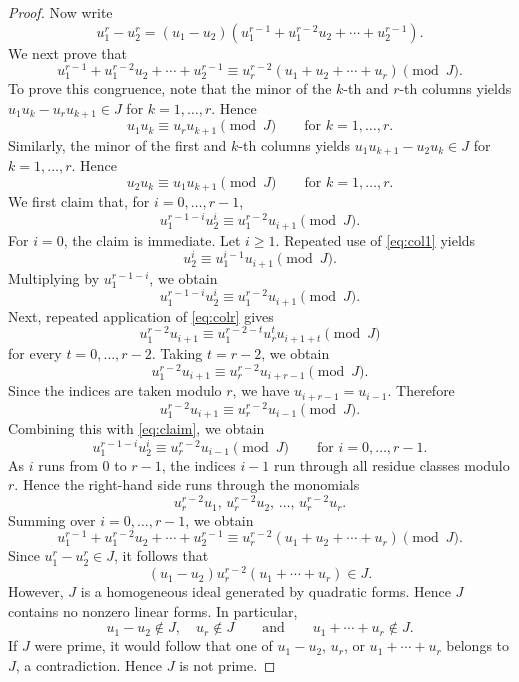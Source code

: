 \documentclass[12pt]{amsart}
\begin{document}
\begin{proof}
Now write
\[
u_1^r-u_2^r
=
(u_1-u_2)
\left(
u_1^{r-1}+u_1^{r-2}u_2+\cdots+u_2^{r-1}
\right).
\]
We next prove that
\[
u_1^{r-1}+u_1^{r-2}u_2+\cdots+u_2^{r-1}
\equiv
u_r^{r-2}(u_1+u_2+\cdots+u_r)
\pmod J.
\]
To prove this congruence, note that the minor of the $k$-th and $r$-th
columns yields $u_1u_k-u_ru_{k+1}\in J$ for $k=1,\ldots,r$. Hence
\begin{equation}\label{eq:colr}
u_1u_k
\equiv
u_ru_{k+1}
\pmod J
\qquad \text{for } k=1,\ldots,r.
\end{equation}
Similarly, the minor of the first and $k$-th columns yields
$u_1u_{k+1}-u_2u_k\in J$ for $k=1,\ldots,r$. Hence
\begin{equation}\label{eq:col1}
u_2u_k
\equiv
u_1u_{k+1}
\pmod J
\qquad \text{for } k=1,\ldots,r.
\end{equation}
We first claim that, for $i=0,\ldots,r-1$,
\begin{equation}\label{eq:claim}
u_1^{r-1-i}u_2^i
\equiv
u_1^{r-2}u_{i+1}
\pmod J.
\end{equation}
For $i=0$, the claim is immediate. Let $i\geq 1$. Repeated use of
\eqref{eq:col1} yields
\[
u_2^i
\equiv
u_1^{i-1}u_{i+1}
\pmod J.
\]
Multiplying by $u_1^{r-1-i}$, we obtain
\[
u_1^{r-1-i}u_2^i
\equiv
u_1^{r-2}u_{i+1}
\pmod J.
\]
Next, repeated application of \eqref{eq:colr} gives
\[
u_1^{r-2}u_{i+1}
\equiv
u_1^{r-2-t}u_r^t u_{i+1+t}
\pmod J
\]
for every $t=0,\ldots,r-2$. Taking $t=r-2$, we obtain
\[
u_1^{r-2}u_{i+1}
\equiv
u_r^{r-2}u_{i+r-1}
\pmod J.
\]
Since the indices are taken modulo $r$, we have
$u_{i+r-1}=u_{i-1}$. Therefore
\[
u_1^{r-2}u_{i+1}
\equiv
u_r^{r-2}u_{i-1}
\pmod J.
\]
Combining this with \eqref{eq:claim}, we obtain
\[
u_1^{r-1-i}u_2^i
\equiv
u_r^{r-2}u_{i-1}
\pmod J
\qquad \text{for } i=0,\ldots,r-1.
\]
As $i$ runs from $0$ to $r-1$, the indices $i-1$ run through all
residue classes modulo $r$. Hence the right-hand side runs through the
monomials
\[
u_r^{r-2}u_1,\,
u_r^{r-2}u_2,\,
\ldots,\,
u_r^{r-2}u_r.
\]
Summing over $i=0,\ldots,r-1$, we obtain
\[
u_1^{r-1}+u_1^{r-2}u_2+\cdots+u_2^{r-1}
\equiv
u_r^{r-2}(u_1+u_2+\cdots+u_r)
\pmod J.
\]
Since $u_1^r-u_2^r\in J$, it follows that
\[
(u_1-u_2)u_r^{r-2}(u_1+\cdots+u_r)\in J.
\]
However, $J$ is a homogeneous ideal generated by quadratic forms. Hence
$J$ contains no nonzero linear forms. In particular,
\[
u_1-u_2\notin J, \quad u_r\notin J
\qquad\text{and}\qquad
u_1+\cdots+u_r\notin J.
\]
If $J$ were prime, it would follow that one of
$u_1-u_2$, $u_r$, or $u_1+\cdots+u_r$ belongs to $J$, a contradiction.
Hence $J$ is not prime.
\hspace{15.1cm}
\end{proof}
\end{document}
